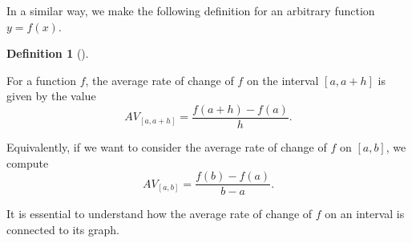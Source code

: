 \documentclass[10pt,]{book}
\theoremstyle{plain}
\theoremstyle{definition}
\newtheorem{definition}[theorem]{Definition}
\theoremstyle{definition}
\theoremstyle{definition}
\theoremstyle{definition}
\theoremstyle{definition}
\numberwithin{equation}{section}
\begin{document}
In a similar way, we make the following definition for an arbitrary function \(y = f(x).\)
%
\begin{definition}[{}]\label{definition-2}

For a function \(f\), the average rate of change \index{} of \(f\) on the interval \([a,a+h]\) is given by the value
%
\begin{equation*}
AV_{[a,a+h]} = \frac{f(a+h)-f(a)}{h}.
\end{equation*}\end{definition}
\par

Equivalently, if we want to consider the average rate of change of \(f\) on \([a,b]\), we compute
%
\begin{equation*}
AV_{[a,b]} = \frac{f(b)-f(a)}{b-a}.
\end{equation*}\par

It is essential to understand how the average rate of change of \(f\) on an interval is connected to its graph.
%
\typeout{************************************************}
\typeout{************************************************}
\end{document}
